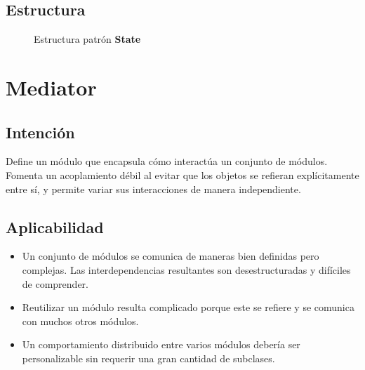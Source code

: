 \subsection*{Estructura}

\begin{figure}[H]
\caption{Estructura patrón \textbf{State}}
\begin{center}
\end{center}
\end{figure}

\section{Mediator}
\label{anexoMediator}

\subsection*{Intención}
Define un módulo que encapsula cómo interactúa un conjunto de módulos. Fomenta un acoplamiento débil al evitar que los objetos se refieran explícitamente entre sí, y permite variar sus interacciones de manera independiente.

\subsection*{Aplicabilidad}
\begin{itemize}
\item Un conjunto de módulos se comunica de maneras bien definidas pero complejas. Las interdependencias resultantes son desestructuradas y difíciles de comprender.

\item Reutilizar un módulo resulta complicado porque este se refiere y se comunica con muchos otros módulos.

\item Un comportamiento distribuido entre varios módulos debería ser personalizable sin requerir una gran cantidad de subclases.
\end{itemize}

